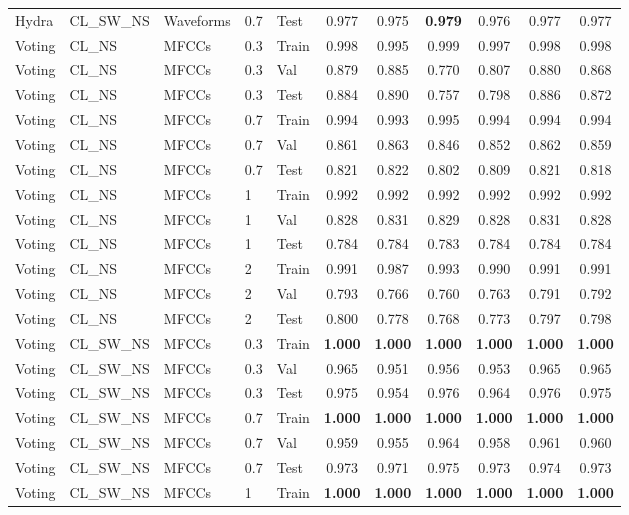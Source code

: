 \begin{landscape}
\begin{longtable}{|l|l|l|l|l|c|c|c|c|c|c|}
Hydra & CL\_SW\_NS & Waveforms & 0.7 & Test & 0.977 & 0.975 & \textbf{0.979} & 0.976 & 0.977 & 0.977 \\
Voting & CL\_NS & MFCCs & 0.3 & Train & 0.998 & 0.995 & 0.999 & 0.997 & 0.998 & 0.998 \\
Voting & CL\_NS & MFCCs & 0.3 & Val & 0.879 & 0.885 & 0.770 & 0.807 & 0.880 & 0.868 \\
Voting & CL\_NS & MFCCs & 0.3 & Test & 0.884 & 0.890 & 0.757 & 0.798 & 0.886 & 0.872 \\
Voting & CL\_NS & MFCCs & 0.7 & Train & 0.994 & 0.993 & 0.995 & 0.994 & 0.994 & 0.994 \\
Voting & CL\_NS & MFCCs & 0.7 & Val & 0.861 & 0.863 & 0.846 & 0.852 & 0.862 & 0.859 \\
Voting & CL\_NS & MFCCs & 0.7 & Test & 0.821 & 0.822 & 0.802 & 0.809 & 0.821 & 0.818 \\
Voting & CL\_NS & MFCCs & 1 & Train & 0.992 & 0.992 & 0.992 & 0.992 & 0.992 & 0.992 \\
Voting & CL\_NS & MFCCs & 1 & Val & 0.828 & 0.831 & 0.829 & 0.828 & 0.831 & 0.828 \\
Voting & CL\_NS & MFCCs & 1 & Test & 0.784 & 0.784 & 0.783 & 0.784 & 0.784 & 0.784 \\
Voting & CL\_NS & MFCCs & 2 & Train & 0.991 & 0.987 & 0.993 & 0.990 & 0.991 & 0.991 \\
Voting & CL\_NS & MFCCs & 2 & Val & 0.793 & 0.766 & 0.760 & 0.763 & 0.791 & 0.792 \\
Voting & CL\_NS & MFCCs & 2 & Test & 0.800 & 0.778 & 0.768 & 0.773 & 0.797 & 0.798 \\
Voting & CL\_SW\_NS & MFCCs & 0.3 & Train & \textbf{1.000} & \textbf{1.000} & \textbf{1.000} & \textbf{1.000} & \textbf{1.000} & \textbf{1.000} \\
Voting & CL\_SW\_NS & MFCCs & 0.3 & Val & 0.965 & 0.951 & 0.956 & 0.953 & 0.965 & 0.965 \\
Voting & CL\_SW\_NS & MFCCs & 0.3 & Test & 0.975 & 0.954 & 0.976 & 0.964 & 0.976 & 0.975 \\
Voting & CL\_SW\_NS & MFCCs & 0.7 & Train & \textbf{1.000} & \textbf{1.000} & \textbf{1.000} & \textbf{1.000} & \textbf{1.000} & \textbf{1.000} \\
Voting & CL\_SW\_NS & MFCCs & 0.7 & Val & 0.959 & 0.955 & 0.964 & 0.958 & 0.961 & 0.960 \\
Voting & CL\_SW\_NS & MFCCs & 0.7 & Test & 0.973 & 0.971 & 0.975 & 0.973 & 0.974 & 0.973 \\
Voting & CL\_SW\_NS & MFCCs & 1 & Train & \textbf{1.000} & \textbf{1.000} & \textbf{1.000} & \textbf{1.000} & \textbf{1.000} & \textbf{1.000} \\

\end{longtable}
\end{landscape}
